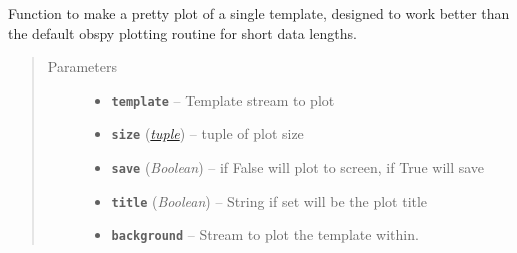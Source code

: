 \documentclass[a4paper,10pt,english]{sphinxmanual}
\begin{document}

\begin{fulllineitems}
\label{utils:EQcorrscan_plotting.pretty_template_plot}
Function to make a pretty plot of a single template, designed to work better
than the default obspy plotting routine for short data lengths.
\begin{quote}\begin{description}
\item[{Parameters}] \leavevmode\begin{itemize}
\item {} 
\textbf{\texttt{template}} -- Template stream to plot

\item {} 
\textbf{\texttt{size}} (\href{https://docs.python.org/library/functions.html\#tuple}{\emph{tuple}}) -- tuple of plot size

\item {} 
\textbf{\texttt{save}} (\emph{Boolean}) -- if False will plot to screen, if True will save

\item {} 
\textbf{\texttt{title}} (\emph{Boolean}) -- String if set will be the plot title

\item {} 
\textbf{\texttt{background}} -- Stream to plot the template within.

\end{itemize}

\end{description}\end{quote}

\end{fulllineitems}

\end{document}
